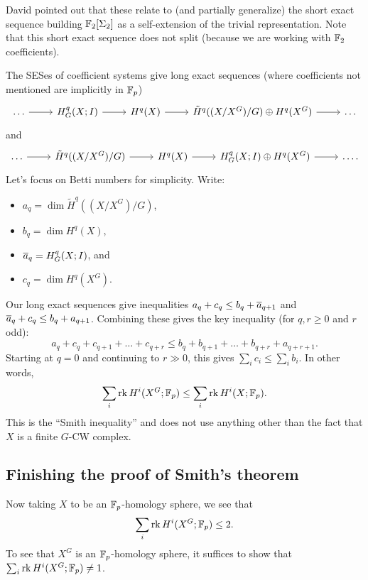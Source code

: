 \documentclass{article}
\begin{document}
\begin{rmk}
  David pointed out that these relate to (and partially generalize) the short exact sequence building $\mathbb{F}_2[\Sigma_2]$ as a self-extension of the trivial representation.
  Note that this short exact sequence does not split (because we are working with $\mathbb{F}_2$ coefficients).
\end{rmk}

The SESes of coefficient systems give long exact sequences (where coefficients not mentioned are implicitly in $\mathbb{F}_p$)
\[
  \begin{tikzcd}
    \dots \rar & H^q_G(X; I) \rar & H^q(X) \rar & \tilde{H}^q((X / X^G) / G) \oplus H^q(X^G) \rar & \dots
  \end{tikzcd}
\]
and
\[
  \begin{tikzcd}
    \dots \rar & \tilde{H}^q((X / X^G) / G) \rar & H^q(X) \rar & H^q_G(X; I) \oplus H^q(X^G) \rar & \dots.
  \end{tikzcd}
\]
Let's focus on Betti numbers for simplicity.
Write:
\begin{itemize}
  \item $a_q = \dim \tilde{H}^q((X / X^G) / G)$,
  \item $b_q = \dim H^q(X)$,
  \item $\overline{a}_q = H^q_G(X; I)$, and
  \item $c_q = \dim H^q(X^G)$.
\end{itemize}
Our long exact sequences give inequalities $a_q + c_q \leq b_q + \overline{a}_{q+1}$ and $\overline{a}_q + c_q \leq b_q + a_{q+1}$.
Combining these gives the key inequality (for $q, r \geq 0$ and $r$ odd):
\[
  a_q + c_q + c_{q+1} + \dots + c_{q+r} \leq b_q + b_{q+1} + \dots + b_{q+r} + a_{q+r+1}.
\]
Starting at $q = 0$ and continuing to $r \gg 0$, this gives $\sum_i c_i \leq \sum_i b_i$.
In other words,
\[
  \sum_i \operatorname{rk} H^i(X^G; \mathbb{F}_p) \leq \sum_i \operatorname{rk} H^i(X; \mathbb{F}_p).
\]
This is the ``Smith inequality'' and does not use anything other than the fact that $X$ is a finite $G$-CW complex.

\subsection{Finishing the proof of Smith's theorem}

Now taking $X$ to be an $\mathbb{F}_p$-homology sphere, we see that
\[
  \sum_i \operatorname{rk} H^i(X^G; \mathbb{F}_p) \leq 2.
\]
To see that $X^G$ is an $\mathbb{F}_p$-homology sphere, it suffices to show that $\sum_i \operatorname{rk} H^i(X^G; \mathbb{F}_p) \neq 1$.
\end{document}
